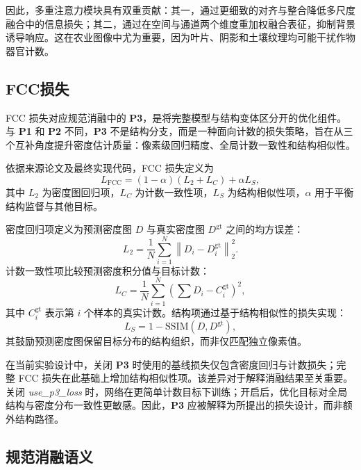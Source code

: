 \documentclass[a4paper,fleqn]{cas-sc}
\begin{document}
因此，多重注意力模块具有双重贡献：其一，通过更细致的对齐与整合降低多尺度融合中的信息损失；其二，通过在空间与通道两个维度重加权融合表征，抑制背景诱导响应。这在农业图像中尤为重要，因为叶片、阴影和土壤纹理均可能干扰作物器官计数。

\subsection{FCC损失}

FCC 损失对应规范消融中的 \textbf{P3}，是将完整模型与结构变体区分开的优化组件。与 \textbf{P1} 和 \textbf{P2} 不同，\textbf{P3} 不是结构分支，而是一种面向计数的损失策略，旨在从三个互补角度提升密度估计质量：像素级回归精度、全局计数一致性和结构相似性。

依据来源论文及最终实现代码，FCC 损失定义为
\begin{equation}
    L_{\mathrm{FCC}} = (1 - \alpha)(L_2 + L_C) + \alpha L_S,
\end{equation}
其中 $L_2$ 为密度图回归项，$L_C$ 为计数一致性项，$L_S$ 为结构相似性项，$\alpha$ 用于平衡结构监督与其他目标。

密度回归项定义为预测密度图 $D$ 与真实密度图 $D^{\mathrm{gt}}$ 之间的均方误差：
\begin{equation}
    L_2 = \frac{1}{N}\sum_{i=1}^{N}\left\| D_i - D_i^{\mathrm{gt}} \right\|_2^2.
\end{equation}
计数一致性项比较预测密度积分值与目标计数：
\begin{equation}
    L_C = \frac{1}{N}\sum_{i=1}^{N}\left(\sum D_i - C_i^{\mathrm{gt}}\right)^2,
\end{equation}
其中 $C_i^{\mathrm{gt}}$ 表示第 $i$ 个样本的真实计数。结构项通过基于结构相似性的损失实现：
\begin{equation}
    L_S = 1 - \mathrm{SSIM}(D, D^{\mathrm{gt}}),
\end{equation}
其鼓励预测密度图保留目标分布的结构组织，而非仅匹配独立像素值。

在当前实验设计中，关闭 \textbf{P3} 时使用的基线损失仅包含密度回归与计数损失；完整 FCC 损失在此基础上增加结构相似性项。该差异对于解释消融结果至关重要。关闭 \textit{use\_p3\_loss} 时，网络在更简单计数目标下训练；开启后，优化目标对全局结构与密度分布一致性更敏感。因此，\textbf{P3} 应被解释为所提出的损失设计，而非额外结构路径。

\subsection{规范消融语义}
\end{document}
